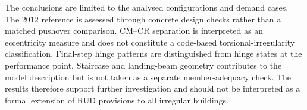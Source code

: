 The conclusions are limited to the analysed configurations and demand cases. The 2012 reference is assessed through concrete design checks rather than a matched pushover comparison. CM--CR separation is interpreted as an eccentricity measure and does not constitute a code-based torsional-irregularity classification. Final-step hinge patterns are distinguished from hinge states at the performance point. Staircase and landing-beam geometry contributes to the model description but is not taken as a separate member-adequacy check. The results therefore support further investigation and should not be interpreted as a formal extension of RUD provisions to all irregular buildings.
